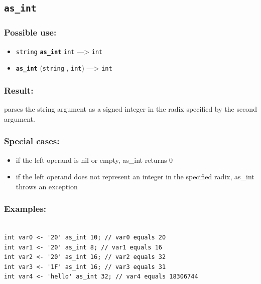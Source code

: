 \documentclass[]{book}
\providecommand{\tightlist}{%
  \setlength{\itemsep}{0pt}\setlength{\parskip}{0pt}}
\theoremstyle{definition}
\theoremstyle{definition}
\theoremstyle{definition}
\theoremstyle{remark}
\begin{document}
\subsection{\texorpdfstring{\texttt{as\_int}}{as\_int}}\label{as_int}

\subsubsection{Possible use:}\label{possible-use-50}

\begin{itemize}
\tightlist
\item
  \texttt{string} \textbf{\texttt{as\_int}} \texttt{int}
  ---\textgreater{} \texttt{int}
\item
  \textbf{\texttt{as\_int}} (\texttt{string} , \texttt{int})
  ---\textgreater{} \texttt{int}
\end{itemize}

\subsubsection{Result:}\label{result-49}

parses the string argument as a signed integer in the radix specified by
the second argument.

\subsubsection{Special cases:}\label{special-cases-19}

\begin{itemize}
\tightlist
\item
  if the left operand is nil or empty, as\_int returns 0\\
\item
  if the left operand does not represent an integer in the specified
  radix, as\_int throws an exception
\end{itemize}

\subsubsection{Examples:}\label{examples-41}

\begin{verbatim}
 
int var0 <- '20' as_int 10; // var0 equals 20 
int var1 <- '20' as_int 8; // var1 equals 16 
int var2 <- '20' as_int 16; // var2 equals 32 
int var3 <- '1F' as_int 16; // var3 equals 31 
int var4 <- 'hello' as_int 32; // var4 equals 18306744
\end{verbatim}
\end{document}
